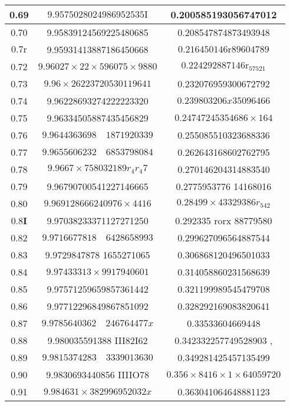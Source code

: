\documentclass[twoside,12pt, showframe]{memoir}
\begin{document}
\begin{center}
\begin{tabular}{|c|c|c|}
\hline
0.69 & \(9.9575028024986952535 \mathrm{I}\) & 0.200585193056747012 \\
\hline
0.70 & 9.95839124569225480685 & 0.208547874873493948 \\
\hline
\(0.7 \mathrm{r}\) & 9.95931413887186450668 & \(0.216450146 \mathrm{r} 89604789\) \\
\hline
0.72 & \(9.96027 \times 22 \times 596075 \times 9880\) & \(0.224292887146 \mathrm{r}_{57521}\) \\
\hline
0.73 & \(9.96 \times 26223720530119641\) & 0.232076959300672792 \\
\hline
0.74 & 9.96228693274222223320 & \(0.239803206 x 35096466\) \\
\hline
0.75 & 9.96334505887435456829 & \(0.24747245354686 \times 164\) \\
\hline
0.76 & \(9.9644363698 \quad 1871920339\) & 0.255085510323688336 \\
\hline
0.77 & \(9.9655606232 \quad 6853798084\) & 0.262643168602762795 \\
\hline
0.78 & \(9.9667 \times 758032189 r_{4} r_{4} 7\) & 0.270146204314883540 \\
\hline
0.79 & 9.96790700541227146665 & 0.2775953776 14168016 \\
\hline
0.80 & \(9.969128666240976 \times 4416\) & \(0.28499 \times 43329386 r_{542}\) \\
\hline
\(0.8 \mathbf{I}\) & 9.97038233371127271250 & 0.292335 rorx 88779580 \\
\hline
0.82 & \(9.9716677818 \quad 6428658993\) & 0.299627096564887544 \\
\hline
0.83 & 9.9729847878 1655271065 & 0.306868120496501033 \\
\hline
0.84 & \(9.97433313 \times 9917940601\) & 0.314058860231568639 \\
\hline
0.85 & 9.97571259659857361442 & 0.321199989545479708 \\
\hline
0.86 & 9.97712296849867851092 & 0.328292169083820641 \\
\hline
0.87 & \(9.9785640362 \quad 246764477 x\) & 0.33533604669448 \\
\hline
0.88 & 9.980035591388 III82I62 & 0.342332257749528903 , \\
\hline
0.89 & \(9.9815374283 \quad 3339013630\) & 0.349281425457135499 \\
\hline
0.90 & 9.9830693440856 IIIIO78 & \(0.356 \times 8416 \times 1 \times 64059720\) \\
\hline
0.91 & \(9.984631 \times 382996952032 x\) & 0.363041064648881123 \\

\end{tabular}
\end{center}
\end{document}
